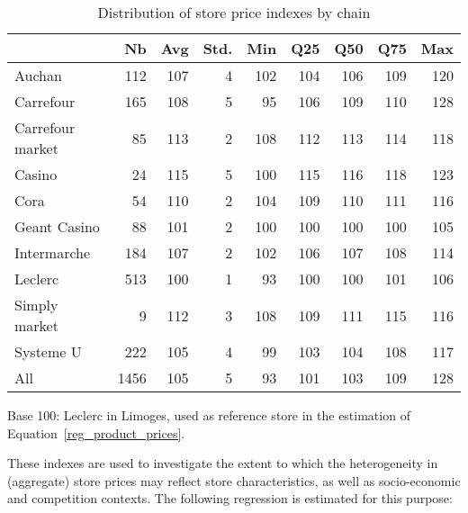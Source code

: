 \documentclass[english]{article}
\begin{document}
\begin{table}[H]
\caption{Distribution of store price indexes by chain}
\label{tab:store_price_indexes}
\begin{threeparttable}
\renewcommand{\arraystretch}{0.7}%
\small
    \begin{tabular}{lrrrrrrrr}
    \toprule
    \toprule
          & Nb    & Avg   & Std.  & Min   & Q25   & Q50   & Q75   & Max \\
    \midrule
    \multicolumn{1}{l}{Auchan} & 112   & 107   & 4     & 102   & 104   & 106   & 109   & 120 \\
    \multicolumn{1}{l}{Carrefour} & 165   & 108   & 5     & 95    & 106   & 109   & 110   & 128 \\
    \multicolumn{1}{l}{Carrefour market} & 85    & 113   & 2     & 108   & 112   & 113   & 114   & 118 \\
    \multicolumn{1}{l}{Casino} & 24    & 115   & 5     & 100   & 115   & 116   & 118   & 123 \\
    \multicolumn{1}{l}{Cora} & 54    & 110   & 2     & 104   & 109   & 110   & 111   & 116 \\
    \multicolumn{1}{l}{Geant Casino} & 88    & 101   & 2     & 100   & 100   & 100   & 100   & 105 \\
    \multicolumn{1}{l}{Intermarche} & 184   & 107   & 2     & 102   & 106   & 107   & 108   & 114 \\
    \multicolumn{1}{l}{Leclerc} & 513   & 100   & 1     & 93    & 100   & 100   & 101   & 106 \\
    \multicolumn{1}{l}{Simply market} & 9     & 112   & 3     & 108   & 109   & 111   & 115   & 116 \\
    \multicolumn{1}{l}{Systeme U} & 222   & 105   & 4     & 99    & 103   & 104   & 108   & 117 \\
    \midrule
    All   & 1456  & 105   & 5     & 93    & 101   & 103   & 109   & 128 \\
    \bottomrule
    \bottomrule
    \end{tabular}
\begin{tablenotes}
      \small
      \item Base 100: Leclerc in Limoges, used as reference store in the estimation of Equation~\ref{reg_product_prices}.
\end{tablenotes}
\end{threeparttable}
\end{table}

These indexes are used to investigate the extent to which the heterogeneity in (aggregate) store prices may reflect store characteristics, as well as socio-economic and competition contexts. The following regression is estimated for this purpose:
\end{document}
